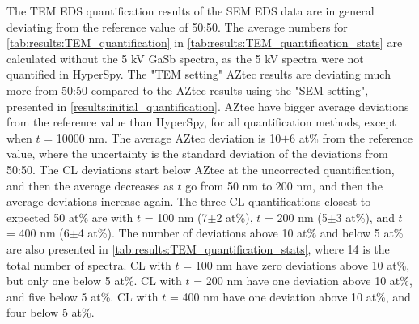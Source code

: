 The TEM EDS quantification results of the SEM EDS data are in general deviating from the reference value of 50:50.
The average numbers for \cref{tab:results:TEM_quantification} in \cref{tab:results:TEM_quantification_stats} are calculated without the 5 kV GaSb spectra, as the 5 kV spectra were not quantified in HyperSpy.
The "TEM setting" AZtec results are deviating much more from 50:50 compared to the AZtec results using the "SEM setting", presented in \cref{results:initial_quantification}.
AZtec have bigger average deviations from the reference value than HyperSpy, for all quantification methods, except when $t$ = 10000 nm.
The average AZtec deviation is 10$\pm$6 at\% from the reference value, where the uncertainty is the standard deviation of the deviations from 50:50.
The CL deviations start below AZtec at the uncorrected quantification, and then the average decreases as $t$ go from 50 nm to 200 nm, and then the average deviations increase again.
The three CL quantifications closest to expected 50 at\% are with $t$ = 100 nm (7$\pm$2 at\%), $t$ = 200 nm (5$\pm$3 at\%), and $t$ = 400 nm (6$\pm$4 at\%).
The number of deviations above 10 at\% and below 5 at\% are also presented in \cref{tab:results:TEM_quantification_stats}, where 14 is the total number of spectra.
CL with $t$ = 100 nm have zero deviations above 10 at\%, but only one below 5 at\%.
CL with $t$ = 200 nm have one deviation above 10 at\%, and five below 5 at\%.
CL with $t$ = 400 nm have one deviation above 10 at\%, and four below 5 at\%.


